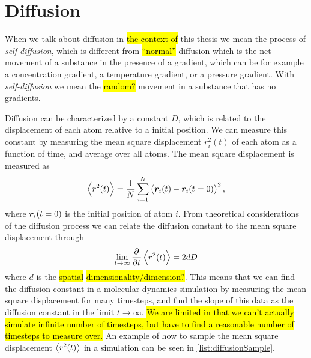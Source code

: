 
\section{Diffusion}
When we talk about diffusion in \hl{the context of} this thesis we mean the process of \emph{self-diffusion}, which is different from \hl{``normal''} diffusion which is the net movement of a substance in the presence of a gradient, which can be for example a concentration gradient, a temperature gradient, or a pressure gradient. With \emph{self-diffusion} we mean the \hl{random?} movement in a substance that has no gradients.

Diffusion can be characterized by a constant $D$, which is related to the displacement of each atom relative to a initial position. We can measure this constant by measuring the mean square displacement $r_i^2(t)$ of each atom as a function of time, and average over all atoms. The mean square displacement is measured as
\begin{align*}
    \Braket{r^2(t)} = \frac{1}{N} \sum_{i=1}^N \left( \boldsymbol{r}_i(t) - \boldsymbol{r}_i(t=0) \right)^2,
\end{align*}
where $\boldsymbol{r}_i(t=0)$ is the initial position of atom $i$. From theoretical considerations of the diffusion process we can relate the diffusion constant to the mean square displacement through\cite[Section~4.4.1]{frenkel2001understanding}
\begin{align}
    \lim_{t\rightarrow \infty}\dpd{}{t}\Braket{r^2(t)} = 2dD\label{eq:diffusion_derivative}
\end{align}
where $d$ is the \hl{spatial} \hl{dimensionality/dimension?}. This means that we can find the diffusion constant in a molecular dynamics simulation by measuring the mean square displacement for many timesteps, and find the slope of this data as the diffusion constant in the limit $t\rightarrow \infty$. \hl{We are limited in that we can't actually simulate infinite number of timesteps, but have to find a reasonable number of timesteps to measure over.} An example of how to sample the mean square displacement $\Braket{r^2(t)}$ in a simulation can be seen in \cref{list:diffusionSample}.
%
